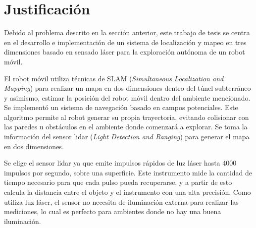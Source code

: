 \section{Justificación}

Debido al problema descrito en la sección anterior, este trabajo de tesis se centra 
en el desarrollo e implementación de un sistema de localización y mapeo en tres 
dimensiones basado en sensado láser para la exploración autónoma de un robot móvil.

El robot móvil utiliza técnicas de SLAM (\textit{Simultaneous Localization and Mapping}) 
para realizar un mapa en dos dimensiones dentro del túnel subterráneo y asimismo, estimar
la posición del robot móvil dentro del ambiente mencionado. Se implementó un sistema de 
navegación basado en campos potenciales. Este algoritmo permite al robot generar su 
propia trayectoria, evitando colisionar con las paredes u obstáculos en el ambiente 
donde comenzará a explorar. Se toma la información del sensor lidar (\textit{Light
Detection and Ranging}) para generar el mapa en dos dimensiones.


Se elige el sensor lidar ya que emite impulsos r\'apidos de luz l\'aser hasta 
4000 impulsos por segundo, sobre una superficie. Este instrumento mide la 
cantidad de tiempo necesario para que cada pulso pueda recuperarse, y a partir 
de esto calcula la distancia entre el objeto y el instrumento con una alta 
precisi\'on. Como utiliza luz l\'aser, el sensor no necesita de iluminaci\'on 
externa para realizar las mediciones, lo cual es perfecto para ambientes
donde no hay una buena iluminaci\'on. 

